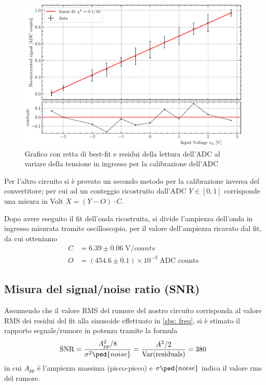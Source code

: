\documentclass[10pt, a4paper, italian]{article}
\begin{document}
\begin{figure}[htbp]
    \centering
	\includegraphics[width=\textwidth]{cal}
    \caption{Grafico con retta di best-fit e residui della lettura dell'ADC
    al variare della tensione in ingresso per la calibrazione dell'ADC
    \label{fig: cal}}
\end{figure}

Per l'altro circuito si è provato un secondo metodo per la calibrazione inversa
del convertitore; per cui ad un conteggio ricostruito dall'ADC $Y \in [0, 1]$
corrisponde una misura in Volt $X = (Y - O) \cdot C$.

Dopo avere eseguito il fit dell'onda ricostruita, si divide l'ampiezza
dell'onda in ingresso misurata tramite oscilloscopio, per il valore
dell'ampiezza ricavato dal fit, da cui otteniamo
\begin{align*}
C &= 6.39 \pm 0.06 \; \si{\V/counts} \\
O &= (454.6 \pm 0.1) \times 10^{-3} \; \text{ADC counts}
\end{align*}

\subsection{Misura del signal/noise ratio (SNR)}
Assumendo che il valore RMS del rumore del nostro circuito corrisponda al
valore RMS dei residui del fit alla sinusoide effettuato in \cref{sbs: freq},
si è stimato il rapporto segnale/rumore in potenza tramite la formula
\begin{equation}\label{eq: SNR}
\text{SNR} = \frac{A_{pp}^2/8}{\sigma^2\ped{noise}} =
\frac{A^2/2}{\text{Var}(\text{residuals})} = 380
\end{equation}
in cui $A_{pp}$ è l'ampiezza massima (picco-picco) e $\sigma\ped{noise}$ indica
il valore rms del rumore.
\end{document}
